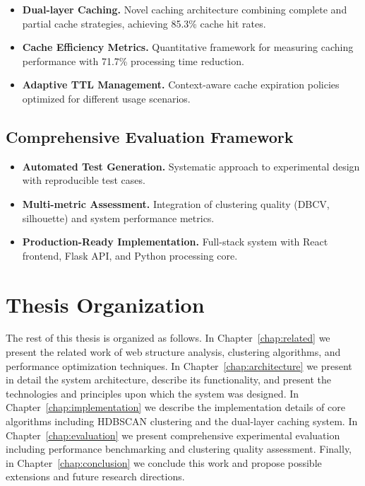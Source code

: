 \begin{itemize}
\item \textbf{Dual-layer Caching.} Novel caching architecture combining complete and partial cache strategies, achieving 85.3\% cache hit rates.
\item \textbf{Cache Efficiency Metrics.} Quantitative framework for measuring caching performance with 71.7\% processing time reduction.
\item \textbf{Adaptive TTL Management.} Context-aware cache expiration policies optimized for different usage scenarios.
\end{itemize}

\subsection{Comprehensive Evaluation Framework}

\begin{itemize}
\item \textbf{Automated Test Generation.} Systematic approach to experimental design with reproducible test cases.
\item \textbf{Multi-metric Assessment.} Integration of clustering quality (DBCV, silhouette) and system performance metrics.
\item \textbf{Production-Ready Implementation.} Full-stack system with React frontend, Flask API, and Python processing core.
\end{itemize}

\section{Thesis Organization}
\label{sec:organization}

The rest of this thesis is organized as follows. In Chapter~\ref{chap:related} we present the related work of web structure analysis, clustering algorithms, and performance optimization techniques. In Chapter~\ref{chap:architecture} we present in detail the {\name} system architecture, describe its functionality, and present the technologies and principles upon which the system was designed. In Chapter~\ref{chap:implementation} we describe the implementation details of core algorithms including HDBSCAN clustering and the dual-layer caching system. In Chapter~\ref{chap:evaluation} we present comprehensive experimental evaluation including performance benchmarking and clustering quality assessment. Finally, in Chapter~\ref{chap:conclusion} we conclude this work and propose possible extensions and future research directions. 